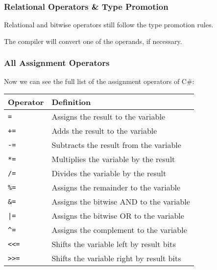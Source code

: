 \begin{frame}
\frametitle{Relational Operators \& Type Promotion}
Relational and bitwise operators still follow the type promotion rules.

The compiler will convert one of the operands, if necessary.

\end{frame}



\begin{frame}
\frametitle{All Assignment Operators}

Now we can see the full list of the assignment operators of C\#:

\begin{center}
\begin{tabular}{l|l}
\textbf{Operator} & \textbf{Definition} \\ \hline
	\texttt{=} & Assigns the result to the variable\\ \hline
	\texttt{+=} & Adds the result to the variable\\ \hline
	\texttt{-=} & Subtracts the result from the variable\\ \hline
	\texttt{*=} & Multiplies the variable by the result\\ \hline
	\texttt{/=} & Divides the variable by the result\\ \hline
	\texttt{\%=} & Assigns the remainder to the variable\\ \hline
	\texttt{\&=} & Assigns the bitwise AND to the variable\\ \hline
	\texttt{|=} & Assigns the bitwise OR to the variable\\ \hline
	\texttt{\^{}=} & Assigns the complement to the variable\\ \hline
	\texttt{\textless\textless =} & Shifts the variable left by result bits\\ \hline
	\texttt{\textgreater\textgreater =} & Shifts the variable right by result bits\\
\end{tabular}
\end{center}
\end{frame}



